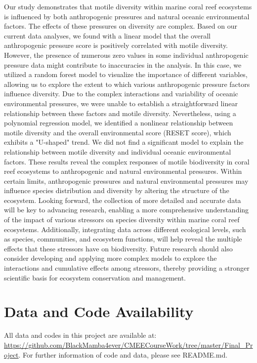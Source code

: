 \documentclass[a4paper, 11]{article}
\begin{document}
Our study demonstrates that motile diversity within marine coral reef ecosystems is influenced by both anthropogenic pressures and natural oceanic environmental factors. The effects of these pressures on diversity are complex. Based on our current data analyses, we found with a linear model that the overall anthropogenic pressure score is positively correlated with motile diversity. However, the presence of numerous zero values in some individual anthropogenic pressure data might contribute to inaccuracies in the analysis. In this case, we utilized a random forest model to visualize the importance of different variables, allowing us to explore the extent to which various anthropogenic pressure factors influence diversity. Due to the complex interactions and variability of oceanic environmental pressures, we were unable to establish a straightforward linear relationship between these factors and motile diversity. Nevertheless, using a polynomial regression model, we identified a nonlinear relationship between motile diversity and the overall environmental score (RESET score), which exhibits a "U-shaped" trend. We did not find a significant model to explain the relationship between motile diversity and individual oceanic environmental factors. These results reveal the complex responses of motile biodiversity in coral reef ecosystems to anthropogenic and natural environmental pressures. Within certain limits, anthropogenic pressures and natural environmental pressures may influence species distribution and diversity by altering the structure of the ecosystem. Looking forward, the collection of more detailed and accurate data will be key to advancing research, enabling a more comprehensive understanding of the impact of various stressors on species diversity within marine coral reef ecosystems. Additionally, integrating data across different ecological levels, such as species, communities, and ecosystem functions, will help reveal the multiple effects that these stressors have on biodiversity. Future research should also consider developing and applying more complex models to explore the interactions and cumulative effects among stressors, thereby providing a stronger scientific basis for ecosystem conservation and management.

\section{Data and Code Availability}

All data and codes in this project are available at:
\url{https://github.com/BlackMamba4ever/CMEECourseWork/tree/master/Final\_Project}. For further information of code and data, please see README.md.


\end{document}
